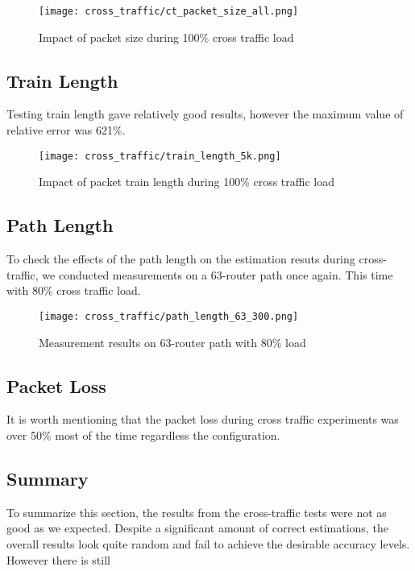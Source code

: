 \begin{figure}[H]
 \centering
 \texttt{[image: cross\_traffic/ct\_packet\_size\_all.png]}
 \caption{Impact of packet size during 100\% cross traffic load}
 \label{ct_packet_size_all}
\end{figure}

\subsection{Train Length}
Testing train length gave relatively good results, however the maximum value of relative error was 621\%.

\begin{figure}[H]
 \centering
 \texttt{[image: cross\_traffic/train\_length\_5k.png]}
 \caption{Impact of packet train length during 100\% cross traffic load}
 \label{ct_packet_size_all}
\end{figure}

\subsection{Path Length}
To check the effects of the path length on the estimation resuts during cross-traffic, we conducted measurements on a 63-router path once again. This time with 80\% cross traffic load. 
\begin{figure}[H]
 \centering
 \texttt{[image: cross\_traffic/path\_length\_63\_300.png]}
 \caption{Measurement results on 63-router path with 80\% load}
 \label{ct_packet_size_all}
\end{figure}


\subsection{Packet Loss}
It is worth mentioning that the packet loss during cross traffic experiments was over 50\% most of the time regardless the configuration.


\subsection{Summary}
To summarize this section, the results from the cross-traffic tests were not as good as we expected. Despite a significant amount of correct estimations, the overall results look quite random and fail to achieve the desirable accuracy levels. However there is still 